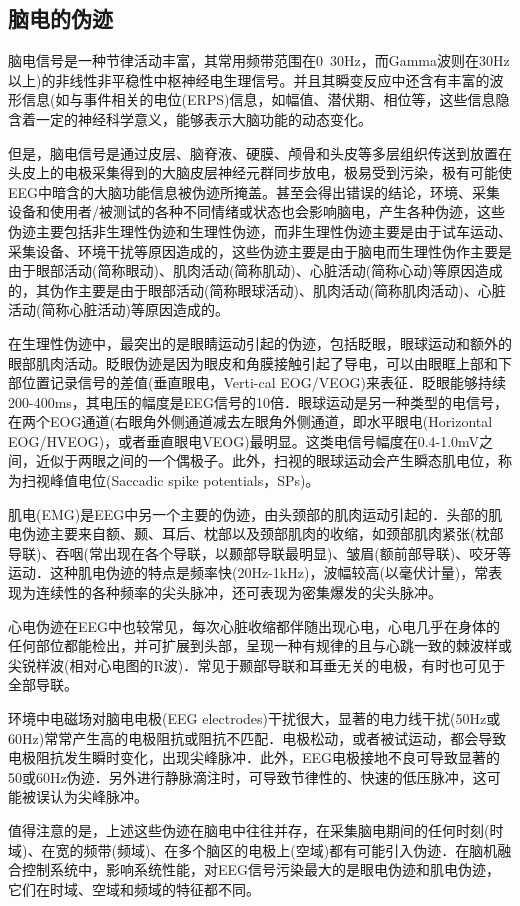 \documentclass{ctexart}
\begin{document}
	\subsection{脑电的伪迹}
		脑电信号是一种节律活动丰富，其常用频带范围在0~30Hz，而Gamma波则在30Hz以上)的非线性非平稳性中枢神经电生理信号。并且其瞬变反应中还含有丰富的波形信息(如与事件相关的电位(ERPS)信息，如幅值、潜伏期、相位等，这些信息隐含着一定的神经科学意义，能够表示大脑功能的动态变化。\par
		但是，脑电信号是通过皮层、脑脊液、硬膜、颅骨和头皮等多层组织传送到放置在头皮上的电极采集得到的大脑皮层神经元群同步放电，极易受到污染，极有可能使EEG中暗含的大脑功能信息被伪迹所掩盖。甚至会得出错误的结论，环境、采集设备和使用者/被测试的各种不同情绪或状态也会影响脑电，产生各种伪迹，这些伪迹主要包括非生理性伪迹和生理性伪迹，而非生理性伪迹主要是由于试车运动、采集设备、环境干扰等原因造成的\cite{视觉反馈人体姿态镇定作用的布朗运动模型分析}，这些伪迹主要是由于脑电而生理性伪作主要是由于眼部活动(简称眼动)、肌肉活动(简称肌动)、心脏活动(简称心动)等原因造成的，其伪作主要是由于眼部活动(简称眼球活动)、肌肉活动(简称肌肉活动)、心脏活动(简称心脏活动)等原因造成的。\par
		在生理性伪迹中，最突出的是眼睛运动引起的伪迹，包括眨眼，眼球运动和额外的眼部肌肉活动。\cite{脑机融合控制中脑电伪迹处理方法}眨眼伪迹是因为眼皮和角膜接触引起了导电，可以由眼眶上部和下部位置记录信号的差值(垂直眼电，Verti-cal EOG/VEOG)来表征．眨眼能够持续200-400ms，其电压的幅度是EEG信号的10倍．眼球运动是另一种类型的电信号，在两个EOG通道(右眼角外侧通道减去左眼角外侧通道，即水平眼电(Horizontal EOG/HVEOG)，或者垂直眼电VEOG)最明显。这类电信号幅度在0.4-1.0mV之间，近似于两眼之间的一个偶极子。此外，扫视的眼球运动会产生瞬态肌电位，称为扫视峰值电位(Saccadic spike potentials，SPs)。\par
		肌电(EMG)是EEG中另一个主要的伪迹，由头颈部的肌肉运动引起的．头部的肌电伪迹主要来自额、颞、耳后、枕部以及颈部肌肉的收缩，如颈部肌肉紧张(枕部导联)、吞咽(常出现在各个导联，以颞部导联最明显)、皱眉(额前部导联)、咬牙等运动．这种肌电伪迹的特点是频率快(20Hz-1kHz)，波幅较高(以毫伏计量)，常表现为连续性的各种频率的尖头脉冲，还可表现为密集爆发的尖头脉冲。\par
		心电伪迹在EEG中也较常见，每次心脏收缩都伴随出现心电，心电几乎在身体的任何部位都能检出，并可扩展到头部，呈现一种有规律的且与心跳一致的棘波样或尖锐样波(相对心电图的R波)．常见于颞部导联和耳垂无关的电极，有时也可见于全部导联\cite{视觉反馈人体姿态镇定作用的布朗运动模型分析}。\par
		环境中电磁场对脑电电极(EEG electrodes)干扰很大，显著的电力线干扰(50Hz或60Hz)常常产生高的电极阻抗或阻抗不匹配．电极松动，或者被试运动，都会导致电极阻抗发生瞬时变化，出现尖峰脉冲．此外，EEG电极接地不良可导致显著的50或60Hz伪迹．另外进行静脉滴注时，可导致节律性的、快速的低压脉冲，这可能被误认为尖峰脉冲\cite{视觉反馈人体姿态镇定作用的布朗运动模型分析}。\par
		值得注意的是，上述这些伪迹在脑电中往往并存，在采集脑电期间的任何时刻(时域)、在宽的频带(频域)、在多个脑区的电极上(空域)都有可能引入伪迹．在脑机融合控制系统中，影响系统性能，对EEG信号污染最大的是眼电伪迹和肌电伪迹，它们在时域、空域和频域的特征都不同。
			
\end{document}

